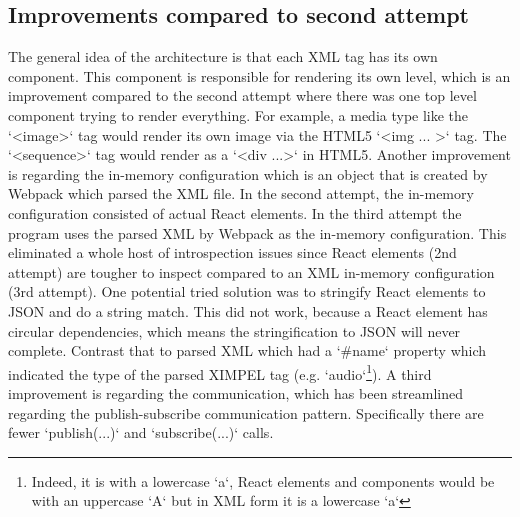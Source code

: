 \subsection{Improvements compared to second attempt}
The general idea of the architecture is that each XML tag has its own component. This component is responsible for rendering its own level, which is an improvement compared to the second attempt where there was one top level component trying to render everything. For example, a media type like the `<image>` tag would render its own image via the HTML5 `<img ... >` tag. The `<sequence>` tag would render as a `<div ...>` in HTML5. Another improvement is regarding the in-memory configuration which is an object that is created by Webpack which parsed the XML file. In the second attempt, the in-memory configuration consisted of actual React elements. In the third attempt the program uses the parsed XML by Webpack as the in-memory configuration. This eliminated a whole host of introspection issues since React elements (2nd attempt) are tougher to inspect compared to an XML in-memory configuration (3rd attempt). One potential tried solution was to stringify React elements to JSON and do a string match. This did not work, because a React element has circular dependencies, which means the stringification to JSON will never complete. Contrast that to parsed XML which had a `#name` property which indicated the type of the parsed XIMPEL tag (e.g. `audio`\footnote{Indeed, it is with a lowercase `a`, React elements and components would be with an uppercase `A` but in XML form it is a lowercase `a`}). A third improvement is regarding the communication, which has been streamlined regarding the publish-subscribe communication pattern. Specifically there are fewer `publish(...)` and `subscribe(...)` calls.




